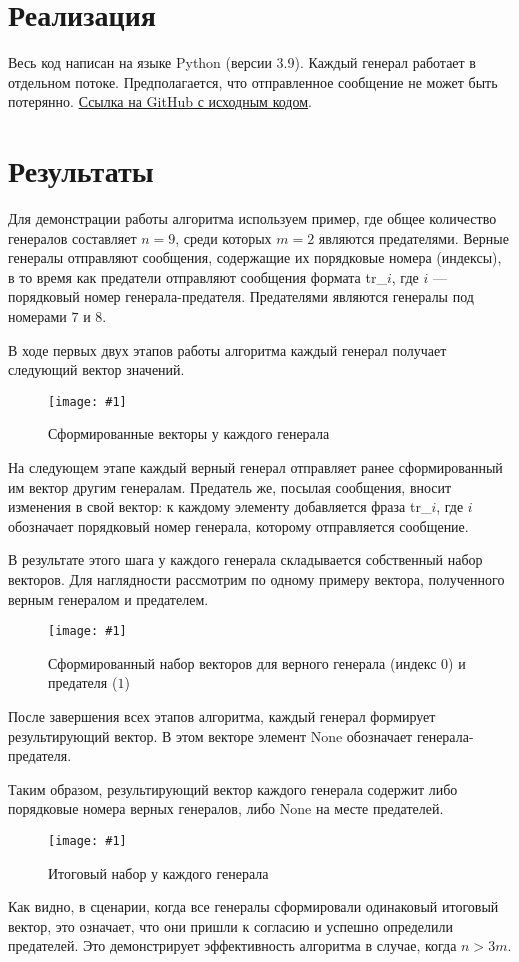 \documentclass[a4paper,12pt]{article}
\newcommand{\plot}[4]{
    \begin{figure}[H]
        \begin{center}
            \texttt{[image: \#1]}
            \caption{#2}
            \label{#3}
        \end{center}
    \end{figure}
}
\begin{document}
    \section{Реализация}
    \quad Весь код написан на языке Python (версии 3.9).
    Каждый генерал работает в отдельном потоке. Предполагается, что отправленное сообщение не может быть потерянно.
    \href{https://github.com/gobdr/Networks/tree/master/3_lab}{Ссылка на GitHub с исходным кодом}.

    \section{Результаты}
    Для демонстрации работы алгоритма используем пример, где общее количество генералов составляет $ n = 9 $, среди которых $ m = 2 $ являются предателями. Верные генералы отправляют сообщения, содержащие их порядковые номера (индексы), в то время как предатели отправляют сообщения формата tr\_$ i $, где $ i $ — порядковый номер генерала-предателя. Предателями являются генералы под номерами $ 7 $ и $ 8 $.

    В ходе первых двух этапов работы алгоритма каждый генерал получает следующий вектор значений.
    \plot{gen1}{Сформированные векторы у каждого генерала}{p:gen1}{0.6}

    На следующем этапе каждый верный генерал отправляет ранее сформированный им вектор другим генералам. Предатель же, посылая сообщения, вносит изменения в свой вектор: к каждому элементу добавляется фраза tr\_$ i $, где $ i $ обозначает порядковый номер генерала, которому отправляется сообщение.

    В результате этого шага у каждого генерала складывается собственный набор векторов. Для наглядности рассмотрим по одному примеру вектора, полученного верным генералом и предателем.
    \plot{gen2}{Сформированный набор векторов для верного генерала (индекс $ 0 $) и предателя ($ 1 $)}{p:gen2}{0.5}

    После завершения всех этапов алгоритма, каждый генерал формирует результирующий вектор. В этом векторе элемент None обозначает генерала-предателя.

    Таким образом, результирующий вектор каждого генерала содержит либо порядковые номера верных генералов, либо None на месте предателей.
    \plot{gen3}{Итоговый набор у каждого генерала}{p:gen3}{0.6}
 
    Как видно, в сценарии, когда все генералы сформировали одинаковый итоговый вектор, это означает, что они пришли к согласию и успешно определили предателей. Это демонстрирует эффективность алгоритма в случае, когда $ n > 3m $.
\end{document}
